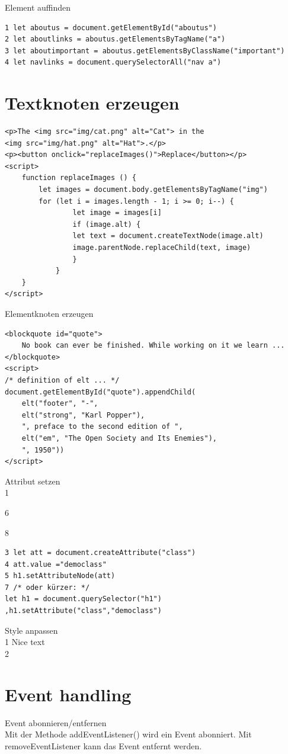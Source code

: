 \documentclass[10pt]{article}
\begin{document}
Element auffinden

\begin{verbatim}
1 let aboutus = document.getElementById("aboutus")
2 let aboutlinks = aboutus.getElementsByTagName("a")
3 let aboutimportant = aboutus.getElementsByClassName("important")
4 let navlinks = document.querySelectorAll("nav a")
\end{verbatim}

\section*{Textknoten erzeugen}
\begin{verbatim}
<p>The <img src="img/cat.png" alt="Cat"> in the
<img src="img/hat.png" alt="Hat">.</p>
<p><button onclick="replaceImages()">Replace</button></p>
<script>
    function replaceImages () {
        let images = document.body.getElementsByTagName("img")
        for (let i = images.length - 1; i >= 0; i--) {
                let image = images[i]
                if (image.alt) {
                let text = document.createTextNode(image.alt)
                image.parentNode.replaceChild(text, image)
                }
            }
    }
</script>
\end{verbatim}

Elementknoten erzeugen

\begin{verbatim}
<blockquote id="quote">
    No book can ever be finished. While working on it we learn ...
</blockquote>
<script>
/* definition of elt ... */
document.getElementById("quote").appendChild(
    elt("footer", "-",
    elt("strong", "Karl Popper"),
    ", preface to the second edition of ",
    elt("em", "The Open Society and Its Enemies"),
    ", 1950"))
</script>
\end{verbatim}

Attribut setzen\\
1

6

8

\begin{verbatim}
3 let att = document.createAttribute("class")
4 att.value ="democlass"
5 h1.setAttributeNode(att)
7 /* oder kürzer: */
let h1 = document.querySelector("h1")
,h1.setAttribute("class","democlass")
\end{verbatim}

Style anpassen\\
1 Nice text\\
2 

\section*{Event handling}
Event abonnieren/entfernen\\
Mit der Methode addEventListener() wird ein Event abonniert. Mit removeEventListener kann das Event entfernt werden.
\end{document}
